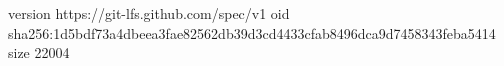 version https://git-lfs.github.com/spec/v1
oid sha256:1d5bdf73a4dbeea3fae82562db39d3cd4433cfab8496dca9d7458343feba5414
size 22004
